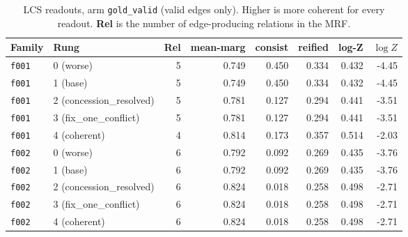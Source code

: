 \documentclass[11pt]{article}
\begin{document}
\begin{table}[htbp]
\centering
\small
\caption{LCS readouts, arm \texttt{gold\_valid} (valid edges only). Higher is more coherent for every readout. \textbf{Rel} is the number of edge-producing relations in the MRF.}
\label{tab:scores-gold-valid}
\begin{tabular}{llrrrrrr}
\toprule
Family & Rung & Rel & \textbf{mean-marg} & \textbf{consist} & \textbf{reified} & \textbf{log-Z} & $\log Z$ \\
\midrule
\texttt{f001} & 0 (worse) & 5 & 0.749 & 0.450 & 0.334 & 0.432 & -4.45 \\
\texttt{f001} & 1 (base) & 5 & 0.749 & 0.450 & 0.334 & 0.432 & -4.45 \\
\texttt{f001} & 2 (concession\_resolved) & 5 & 0.781 & 0.127 & 0.294 & 0.441 & -3.51 \\
\texttt{f001} & 3 (fix\_one\_conflict) & 5 & 0.781 & 0.127 & 0.294 & 0.441 & -3.51 \\
\texttt{f001} & 4 (coherent) & 4 & 0.814 & 0.173 & 0.357 & 0.514 & -2.03 \\
\midrule
\texttt{f002} & 0 (worse) & 6 & 0.792 & 0.092 & 0.269 & 0.435 & -3.76 \\
\texttt{f002} & 1 (base) & 6 & 0.792 & 0.092 & 0.269 & 0.435 & -3.76 \\
\texttt{f002} & 2 (concession\_resolved) & 6 & 0.824 & 0.018 & 0.258 & 0.498 & -2.71 \\
\texttt{f002} & 3 (fix\_one\_conflict) & 6 & 0.824 & 0.018 & 0.258 & 0.498 & -2.71 \\
\texttt{f002} & 4 (coherent) & 6 & 0.824 & 0.018 & 0.258 & 0.498 & -2.71 \\
\bottomrule
\end{tabular}
\end{table}
\end{document}

